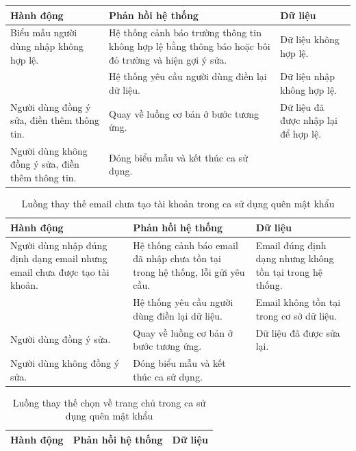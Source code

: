\documentclass[./../main.tex]{subfiles}
\begin{document}
\begin{itemize}
\begin{table}[H]
\begin{tabularx}{\textwidth}{| X | X | X |}
            \hline
            \textbf{Hành động} & \textbf{Phản hồi hệ thống} & \textbf{Dữ liệu} \\ \hline
            Biểu mẫu người dùng nhập không hợp lệ. & Hệ thống cảnh báo trường thông tin không hợp lệ bằng thông báo hoặc bôi đỏ trường và hiện gợi ý sửa. & Dữ liệu không hợp lệ.
            \\ \hline
            & Hệ thống yêu cầu người dùng điền lại dữ liệu. & Dữ liệu nhập không hợp lệ.
            \\ \hline
            Người dùng đồng ý sửa, điền thêm thông tin. & Quay về luồng cơ bản ở bước tương ứng. & Dữ liệu đã được nhập lại để hợp lệ.
            \\ \hline
            Người dùng không đồng ý sửa, điền thêm thông tin. & Đóng biểu mẫu và kết thúc ca sử dụng. & 
            \\ \hline
        \end{tabularx}
        \end{table}  
        \begin{table}[H]
        \caption{\label{uc-9}Luồng thay thế email chưa tạo tài khoản trong ca sử dụng quên mật khẩu}
        \begin{tabularx}{\textwidth}{| X | X | X |}
            \hline
            \textbf{Hành động} & \textbf{Phản hồi hệ thống} & \textbf{Dữ liệu} \\ \hline
            Người dùng nhập đúng định dạng email nhưng email chưa được tạo tài khoản. & Hệ thống cảnh báo email đã nhập chưa tồn tại trong hệ thống, lỗi gửi yêu cầu. & Email đúng định dạng nhưng không tồn tại trong hệ thống.
            \\ \hline
            & Hệ thống yêu cầu người dùng điền lại dữ liệu. & Email không tồn tại trong cơ sở dữ liệu.
            \\ \hline
            Người dùng đồng ý sửa. & Quay về luồng cơ bản ở bước tương ứng. & Dữ liệu đã được sửa lại.
            \\ \hline
            Người dùng không đồng ý sửa. & Đóng biểu mẫu và kết thúc ca sử dụng. & 
            \\ \hline
        \end{tabularx}
        \end{table}
        \begin{table}[H]
        \caption{\label{uc-10}Luồng thay thế chọn về trang chủ trong ca sử dụng quên mật khẩu}
        \begin{tabularx}{\textwidth}{| X | X | X |}
            \hline
            \textbf{Hành động} & \textbf{Phản hồi hệ thống} & \textbf{Dữ liệu} \\ \hline

\end{tabularx}
\end{table}
\end{itemize}
\end{document}
